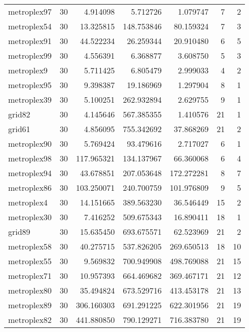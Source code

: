 \begin{longtable}{|l|r|r|r|r|r|r|}
metroplex97 & 30 & 4.914098 & 5.712726 & 1.079747 & 7 & 2 \\
metroplex54 & 30 & 13.325815 & 148.753846 & 80.159324 & 7 & 3 \\
metroplex91 & 30 & 44.522234 & 26.259344 & 20.910480 & 6 & 5 \\
metroplex99 & 30 & 4.556391 & 6.368877 & 3.608750 & 5 & 3 \\
metroplex9 & 30 & 5.711425 & 6.805479 & 2.999033 & 4 & 2 \\
metroplex95 & 30 & 9.398387 & 19.186969 & 1.297904 & 8 & 1 \\
metroplex39 & 30 & 5.100251 & 262.932894 & 2.629755 & 9 & 1 \\
grid82 & 30 & 4.145646 & 567.385355 & 1.410576 & 21 & 1 \\
grid61 & 30 & 4.856095 & 755.342692 & 37.868269 & 21 & 2 \\
metroplex90 & 30 & 5.769424 & 93.479616 & 2.717027 & 6 & 1 \\
metroplex98 & 30 & 117.965321 & 134.137967 & 66.360068 & 6 & 4 \\
metroplex94 & 30 & 43.678851 & 207.053648 & 172.272281 & 8 & 7 \\
metroplex86 & 30 & 103.250071 & 240.700759 & 101.976809 & 9 & 5 \\
metroplex4 & 30 & 14.151665 & 389.563230 & 36.546449 & 15 & 2 \\
metroplex30 & 30 & 7.416252 & 509.675343 & 16.890411 & 18 & 1 \\
grid89 & 30 & 15.635450 & 693.675571 & 62.523969 & 21 & 2 \\
metroplex58 & 30 & 40.275715 & 537.826205 & 269.650513 & 18 & 10 \\
metroplex55 & 30 & 9.569832 & 700.949908 & 498.769088 & 21 & 15 \\
metroplex71 & 30 & 10.957393 & 664.469682 & 369.467171 & 21 & 12 \\
metroplex80 & 30 & 35.494824 & 673.529716 & 413.453178 & 21 & 13 \\
metroplex89 & 30 & 306.160303 & 691.291225 & 622.301956 & 21 & 19 \\
metroplex82 & 30 & 441.880850 & 790.129271 & 716.383780 & 21 & 19 \\
\end{longtable}
